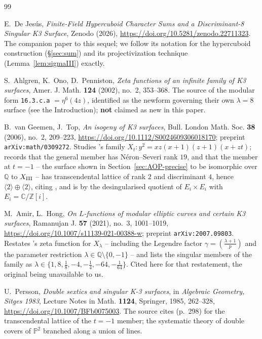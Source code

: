 \documentclass[11pt]{amsart}
\theoremstyle{definition}
\newcommand{\Q}{\mathbb{Q}}
\newcommand{\Z}{\mathbb{Z}}
\begin{document}
\begin{thebibliography}{99}

E.~De Jes\'us, \emph{Finite-Field Hypercuboid Character Sums and a
Discriminant-8 Singular K3 Surface}, Zenodo (2026),
\url{https://doi.org/10.5281/zenodo.22711323}. The companion paper to
this sequel; we follow its notation for the hypercuboid construction
(\S\ref{sec:sum}) and its projectivization technique
(Lemma~\ref{lem:sigmaIII}) exactly.

S.~Ahlgren, K.~Ono, D.~Penniston, \emph{Zeta functions of an infinite
family of K3 surfaces}, Amer. J. Math. \textbf{124} (2002), no.~2,
353--368. The source of the modular form \texttt{16.3.c.a}
$=\eta^6(4z)$, identified as the newform governing their own
$\lambda=8$ surface (see the Introduction); \textbf{not} claimed as new
in this paper.

B.~van Geemen, J.~Top, \emph{An isogeny of K3 surfaces}, Bull. London
Math. Soc. \textbf{38} (2006), no.~2, 209--223,
\url{https://doi.org/10.1112/S0024609306018170}; preprint
\texttt{arXiv:math/0309272}. Studies \cite{AOP2002}'s family
$X_t:y^2=xz(x+1)(z+1)(x+zt)$; records that the general member has
N\'eron--Severi rank $19$, and that the member at $t=-1$ -- the surface
shown in Section~\ref{sec:AOP-precise} to be isomorphic over $\Q$ to
$X_{\rm III}$ -- has transcendental lattice of rank $2$ and discriminant
$4$, hence $\langle2\rangle\oplus\langle2\rangle$, citing
\cite{Persson1985}, and is by \cite{ShiodaInose1977} the desingularised
quotient of $E_i\times E_i$ with $E_i=\mathbb{C}/\Z[i]$.

M.~Amir, L.~Hong, \emph{On $L$-functions of modular elliptic curves and
certain K3 surfaces}, Ramanujan J. \textbf{57} (2021), no.~3, 1001--1019,
\url{https://doi.org/10.1007/s11139-021-00388-w}; preprint
\texttt{arXiv:2007.09803}. Restates \cite{AOP2002}'s zeta function for
$X_\lambda$ -- including the Legendre factor
$\gamma=\left(\frac{\lambda+1}{p}\right)$ and the parameter restriction
$\lambda\in\Q\setminus\{0,-1\}$ -- and lists the singular members of the
family as $\lambda\in\{1,8,\frac18,-4,-\frac14,-64,-\frac1{64}\}$. Cited
here for that restatement, the original being unavailable to us.

U.~Persson, \emph{Double sextics and singular K-3 surfaces}, in
\emph{Algebraic Geometry, Sitges 1983}, Lecture Notes in Math.
\textbf{1124}, Springer, 1985, 262--328,
\url{https://doi.org/10.1007/BFb0075003}. The source
\cite{vanGeemenTop2006} cites (p.~298) for the transcendental lattice of
the $t=-1$ member; the systematic theory of double covers of
$\mathbb{P}^2$ branched along a union of lines.


\end{thebibliography}
\end{document}

